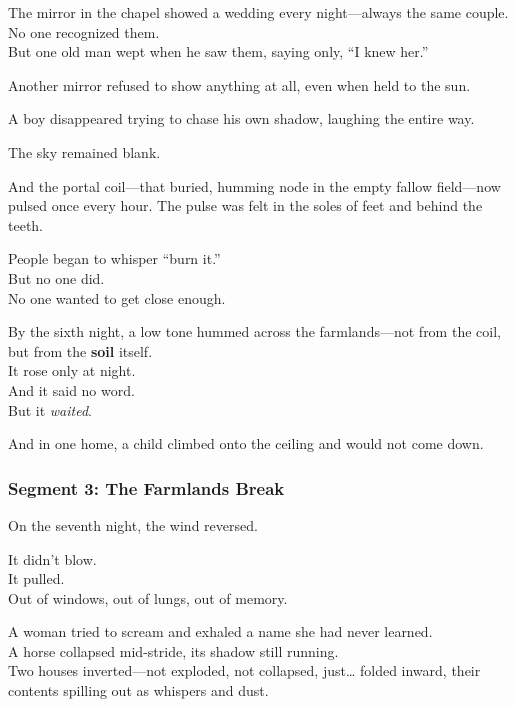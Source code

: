 \documentclass[9pt]{article}
\begin{document}
\vspace{0.5em}
The mirror in the chapel showed a wedding every night---always the same couple.\\
No one recognized them.\\
But one old man wept when he saw them, saying only, ``I knew her.''

\vspace{0.5em}
Another mirror refused to show anything at all, even when held to the sun.

\vspace{0.5em}
A boy disappeared trying to chase his own shadow, laughing the entire way.

\vspace{0.5em}
The sky remained blank.

\vspace{0.5em}
And the portal coil---that buried, humming node in the empty fallow field---now pulsed once every hour. The pulse was felt in the soles of feet and behind the teeth.

\vspace{0.5em}
People began to whisper ``burn it.''\\
But no one did.\\
No one wanted to get close enough.

\vspace{0.5em}
By the sixth night, a low tone hummed across the farmlands---not from the coil, but from the \textbf{soil} itself.\\
It rose only at night.\\
And it said no word.\\
But it \textit{waited}.

\vspace{0.5em}
And in one home, a child climbed onto the ceiling and would not come down.

\newpage

\subsubsection*{Segment 3: The Farmlands Break}

On the seventh night, the wind reversed.

\vspace{0.5em}
It didn’t blow.\\
It pulled.\\
Out of windows, out of lungs, out of memory.

\vspace{0.5em}
A woman tried to scream and exhaled a name she had never learned.\\
A horse collapsed mid-stride, its shadow still running.\\
Two houses inverted---not exploded, not collapsed, just\ldots{} folded inward, their contents spilling out as whispers and dust.
\end{document}
